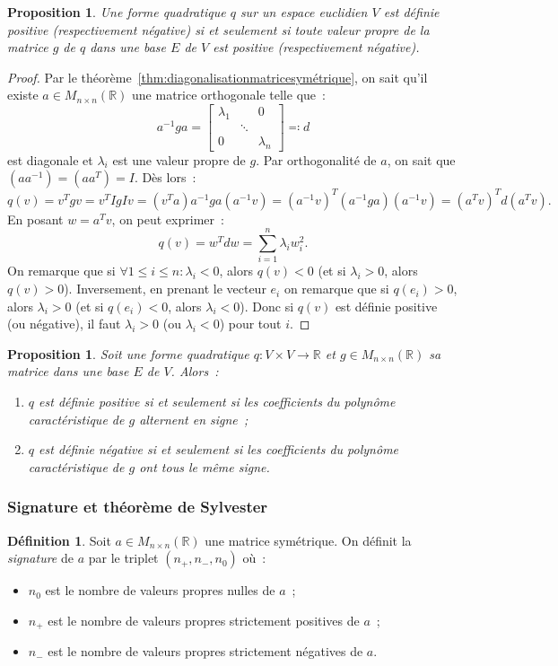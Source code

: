 \documentclass{article}
\newcommand{\R}{\mathbb R}
\newcommand{\M}[3]{M_{#1 \times #2}(#3)}
\newtheorem{prp}[thm]{Proposition}
\theoremstyle{definition}
\newtheorem{déf}[thm]{Définition}
\theoremstyle{remark}
\begin{document}
		\begin{prp} Une forme quadratique $q$ sur un espace euclidien $V$ est définie positive (respectivement négative) si et seulement si toute valeur propre de la
		matrice $g$ de $q$ dans une base $E$ de $V$ est positive (respectivement négative).
		\end{prp}

		\begin{proof} Par le théorème~\ref{thm:diagonalisationmatricesymétrique}, on sait qu'il existe $a \in \M nn\R$ une matrice orthogonale telle que~:
		\[a^{-1}ga = \begin{bmatrix}\lambda_1 &  & 0 \\ & \ddots & \\0 &  & \lambda_n\end{bmatrix} \eqqcolon d\]
		est diagonale et $\lambda_i$ est une valeur propre de $g$. Par orthogonalité de $a$, on sait que $(aa^{-1}) = (aa^T) = I$. Dès lors~:
		\[q(v) = v^Tgv = v^TIgIv = (v^Ta)a^{-1}ga(a^{-1}v) = (a^{-1}v)^T(a^{-1}ga)(a^{-1}v) = (a^Tv)^Td(a^Tv).\]
		En posant $w = a^Tv$, on peut exprimer~:
		\[q(v) = w^Tdw = \sum_{i=1}^n\lambda_iw_i^2.\]
		On remarque que si $\forall 1 \leq i \leq n : \lambda_i < 0$, alors $q(v) < 0$ (et si $\lambda_i > 0$, alors $q(v) > 0$). Inversement, en prenant le vecteur
		$e_i$ on remarque que si $q(e_i) > 0$, alors $\lambda_i > 0$ (et si $q(e_i) < 0$, alors $\lambda_i < 0$). Donc si $q(v)$ est définie positive (ou négative),
		il faut $\lambda_i > 0$ (ou $\lambda_i < 0$) pour tout $i$.
		\end{proof}

		\begin{prp} Soit une forme quadratique $q : V \times V \to \R$ et $g \in \M nn\R$ sa matrice dans une base $E$ de $V$. Alors~:
		\begin{enumerate}
			\item $q$ est définie positive si et seulement si les coefficients du polynôme caractéristique de $g$ alternent en signe~;
			\item $q$ est définie négative si et seulement si les coefficients du polynôme caractéristique de $g$ ont tous le même signe.
		\end{enumerate}
		\end{prp}

		\subsubsection{Signature et théorème de Sylvester}
		\begin{déf} Soit $a \in \M nn\R$ une matrice symétrique. On définit la \emph{signature} de $a$ par le triplet $(n_+, n_-, n_0)$ où~:
		\begin{itemize}
			\item $n_0$ est le nombre de valeurs propres nulles de $a$~;
			\item $n_+$ est le nombre de valeurs propres strictement positives de $a$~;
			\item $n_-$ est le nombre de valeurs propres strictement négatives de $a$.
		\end{itemize}
		\end{déf}
\end{document}

